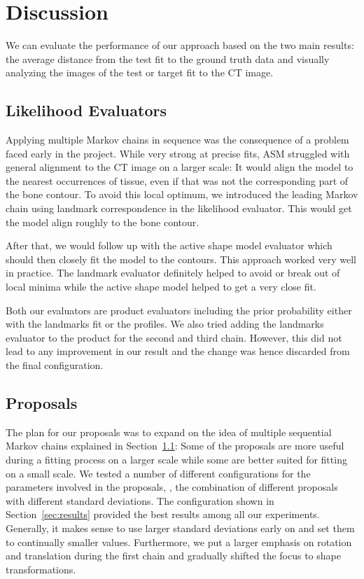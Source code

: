 \section{Discussion}
\label{sec:discussion}

We can evaluate the performance of our approach based on the two main results: the average distance from the test fit to the ground truth data and visually analyzing the images of the test or target fit to the CT image. 


\subsection{Likelihood Evaluators}
\label{subsec:evaluators}

Applying multiple Markov chains in sequence was the consequence of a problem faced early in the project.
While very strong at precise fits, ASM struggled with general alignment to the CT image on a larger scale: It would align the model to the nearest occurrences of tissue, even if that was not the corresponding part of the bone contour.
To avoid this local optimum, we introduced the leading Markov chain using landmark correspondence in the likelihood evaluator.
This would get the model align roughly to the bone contour. 

After that, we would follow up with the active shape model evaluator which should then closely fit the model to the contours. 
This approach worked very well in practice. 
The landmark evaluator definitely helped to avoid or break out of local minima while the active shape model helped to get a very close fit.

Both our evaluators are product evaluators including the prior probability either with the landmarks fit or the profiles.
We also tried adding the landmarks evaluator to the product for the second and third chain.
However, this did not lead to any improvement in our result and the change was hence discarded from the final configuration.


\subsection{Proposals}
\label{subsec:proposals}

The plan for our proposals was to expand on the idea of multiple sequential Markov chains explained in Section~\ref{subsec:evaluators}: Some of the proposals are more useful during a fitting process on a larger scale while some are better suited for fitting on a small scale. 
We tested a number of different configurations for the parameters involved in the proposals, \ie, the combination of different proposals with different standard deviations. 
The configuration shown in Section~\ref{sec:results} provided the best results among all our experiments. 
Generally, it makes sense to use larger standard deviations early on and set them to continually smaller values. 
Furthermore, we put a larger emphasis on rotation and translation during the first chain and gradually shifted the focus to shape transformations.

